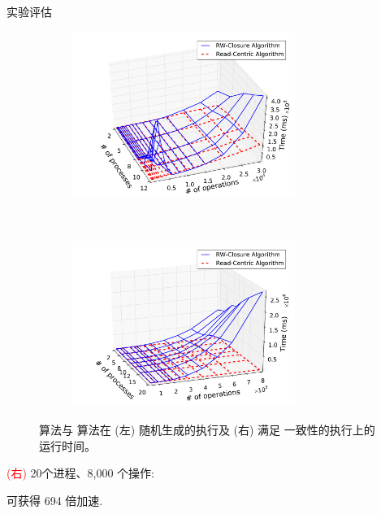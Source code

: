 \begin{frame}{实验评估}
  \begin{figure}[t]
	\centering
	\begin{subfigure}[t]{0.50\textwidth}
	  \includegraphics[width = 0.80\textwidth]{figures/vpc-random-cmp.pdf}
	\end{subfigure}%
	~
	\begin{subfigure}[t]{0.50\textwidth}
	  \includegraphics[width = 0.80\textwidth]{figures/vpc-valid-cmp.pdf}
	\end{subfigure}
	\caption{\rwclosure{} 算法与 \readcentric{} 算法在
	\textcolor{blue!80}{ (左) 随机生成}的执行及
	\textcolor{red!80}{ (右) 满足 \PRAM{} 一致性}的执行上的运行时间。}
  \end{figure}

  \pause
  \begin{center}
	\textcolor{red}{(右)} 20个进程、8,000 个操作: 

	\readcentric{} 可获得 694 倍加速.
  \end{center}
\end{frame}
